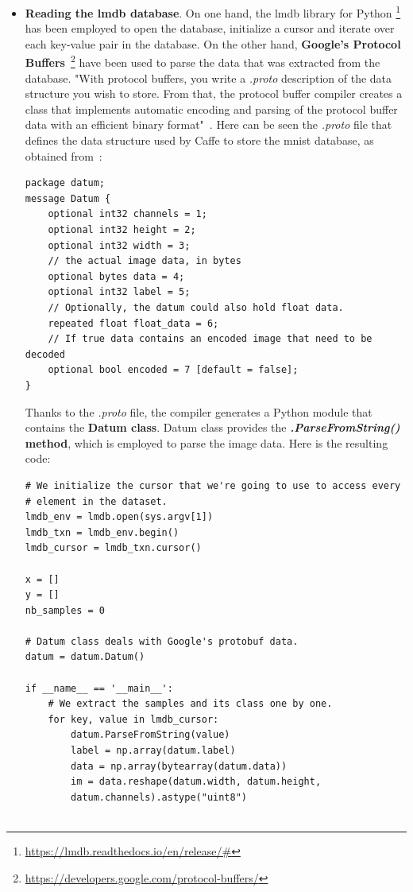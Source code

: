 \begin{itemize}
	\item \textbf{Reading the \gls{lmdb} database}. On one hand, the \gls{lmdb} library for Python \footnote{\url{https://lmdb.readthedocs.io/en/release/\#}} has been employed to open the database, initialize a cursor and iterate over each key-value pair in the database. On the other hand, \textbf{Google's Protocol Buffers}~\footnote{\url{https://developers.google.com/protocol-buffers/}} have been used to parse the data that was extracted from the database. "With protocol buffers, you write a \textit{.proto} description of the data structure you wish to store. From that, the protocol buffer compiler creates a class that implements automatic encoding and parsing of the protocol buffer data with an efficient binary format"~\cite{protobuf}. Here can be seen the \textit{.proto} file that defines the data structure used by Caffe to store the \gls{mnist} database, as obtained from~\cite{lmdb_tutorial}: 
	
\begin{lstlisting}
package datum;
message Datum {
	optional int32 channels = 1;
	optional int32 height = 2;
	optional int32 width = 3;
	// the actual image data, in bytes
	optional bytes data = 4;
	optional int32 label = 5;
	// Optionally, the datum could also hold float data.
	repeated float float_data = 6;
	// If true data contains an encoded image that need to be decoded
	optional bool encoded = 7 [default = false];
}
\end{lstlisting}
	
	Thanks to the \textit{.proto} file, the compiler generates a Python module that contains the \textbf{Datum class}. Datum class provides the \textbf{\textit{.ParseFromString()} method}, which is employed to parse the image data. Here is the resulting code:

\begin{lstlisting}
# We initialize the cursor that we're going to use to access every
# element in the dataset.
lmdb_env = lmdb.open(sys.argv[1])
lmdb_txn = lmdb_env.begin()
lmdb_cursor = lmdb_txn.cursor()

x = []
y = []
nb_samples = 0

# Datum class deals with Google's protobuf data.
datum = datum.Datum()

if __name__ == '__main__':
	# We extract the samples and its class one by one.
	for key, value in lmdb_cursor:
		datum.ParseFromString(value)
		label = np.array(datum.label)
		data = np.array(bytearray(datum.data))
		im = data.reshape(datum.width, datum.height,
		datum.channels).astype("uint8")
	

\end{lstlisting}
\end{itemize}
